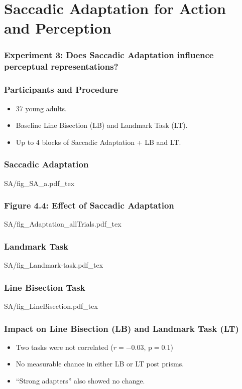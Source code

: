 \documentclass{beamer}
\begin{document}
\section[Saccadic Adaptation]{Saccadic Adaptation for Action and Perception}

\begin{frame}
	\frametitle{Experiment 3: Does Saccadic Adaptation influence perceptual representations?}
		\tableofcontents[currentsection]
\end{frame}

\begin{frame}
	\frametitle{Participants and Procedure}
	\begin{itemize}
		\item 37 young adults.
		\item Baseline Line Bisection (LB) and Landmark Task (LT).
		\item Up to 4 blocks of Saccadic Adaptation + LB and LT.
	\end{itemize}
\end{frame}



\begin{frame}
	\frametitle{Saccadic Adaptation}
	\centering
	\def\svgwidth{0.7\textwidth}
	\tiny
	{SA/fig_SA_a.pdf_tex}
\end{frame}

\begin{frame}
	\frametitle{Figure 4.4: Effect of Saccadic Adaptation}
	\centering
	\def\svgwidth{0.9\textwidth}
	\tiny
	{SA/fig_Adaptation_allTrials.pdf_tex}
\end{frame}

\begin{frame}
	\frametitle{Landmark Task}
	\def\svgwidth{0.8\textwidth}
	{SA/fig_Landmark-task.pdf_tex}
\end{frame}

\begin{frame}
	\frametitle{Line Bisection Task}
	\def\svgwidth{0.9\textwidth}
	{SA/fig_LineBisection.pdf_tex}
\end{frame}

\begin{frame}
	\frametitle{Impact on Line Bisection (LB) and Landmark Task (LT)}
	\begin{itemize}
		\item Two tasks were not correlated ($r = -0.03$, $\text{p} = 0.1$)
		\item No measurable chance in either LB or LT post prisms.
		\item ``Strong adapters'' also showed no change.
	\end{itemize}

\end{frame}
\end{document}

